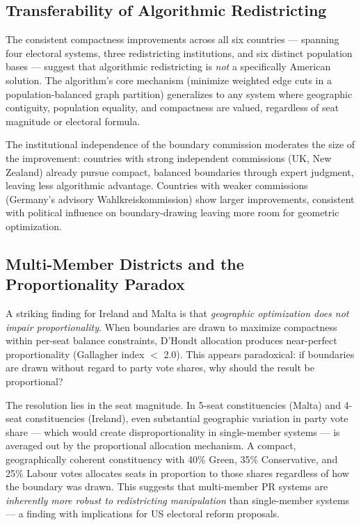 
\subsection{Transferability of Algorithmic Redistricting}

The consistent compactness improvements across all six countries --- spanning four electoral systems, three redistricting institutions, and six distinct population bases --- suggest that algorithmic redistricting is \emph{not} a specifically American solution. The algorithm's core mechanism (minimize weighted edge cuts in a population-balanced graph partition) generalizes to any system where geographic contiguity, population equality, and compactness are valued, regardless of seat magnitude or electoral formula.

The institutional independence of the boundary commission moderates the size of the improvement: countries with strong independent commissions (UK, New Zealand) already pursue compact, balanced boundaries through expert judgment, leaving less algorithmic advantage. Countries with weaker commissions (Germany's advisory Wahlkreiskommission) show larger improvements, consistent with political influence on boundary-drawing leaving more room for geometric optimization.

\subsection{Multi-Member Districts and the Proportionality Paradox}

A striking finding for Ireland and Malta is that \emph{geographic optimization does not impair proportionality}. When boundaries are drawn to maximize compactness within per-seat balance constraints, D'Hondt allocation produces near-perfect proportionality (Gallagher index $<$ 2.0). This appears paradoxical: if boundaries are drawn without regard to party vote shares, why should the result be proportional?

The resolution lies in the seat magnitude. In 5-seat constituencies (Malta) and 4-seat constituencies (Ireland), even substantial geographic variation in party vote share --- which would create disproportionality in single-member systems --- is averaged out by the proportional allocation mechanism. A compact, geographically coherent constituency with 40\% Green, 35\% Conservative, and 25\% Labour votes allocates seats in proportion to those shares regardless of how the boundary was drawn. This suggests that multi-member PR systems are \emph{inherently more robust to redistricting manipulation} than single-member systems --- a finding with implications for US electoral reform proposals.

